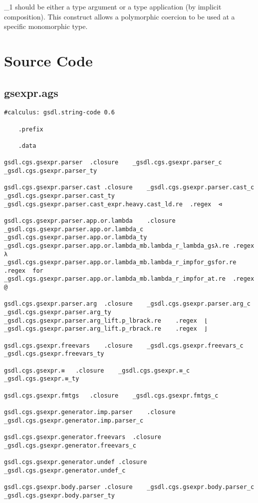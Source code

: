 \documentclass{report}
\begin{document}
\<\tau_1\> should be either a type argument or a type application (by implicit composition).
This construct allows a polymorphic coercion to be used at a specific monomorphic type.

\chapter{Source Code}

\section{gsexpr.ags}

\begin{verbatim}
#calculus: gsdl.string-code 0.6

	.prefix

	.data

gsdl.cgs.gsexpr.parser	.closure	_gsdl.cgs.gsexpr.parser_c	_gsdl.cgs.gsexpr.parser_ty

gsdl.cgs.gsexpr.parser.cast	.closure	_gsdl.cgs.gsexpr.parser.cast_c	_gsdl.cgs.gsexpr.parser.cast_ty
_gsdl.cgs.gsexpr.parser.cast_expr.heavy.cast_ld.re	.regex	⊲

gsdl.cgs.gsexpr.parser.app.or.lambda	.closure	_gsdl.cgs.gsexpr.parser.app.or.lambda_c	_gsdl.cgs.gsexpr.parser.app.or.lambda_ty
_gsdl.cgs.gsexpr.parser.app.or.lambda_mb.lambda_r_lambda_gsλ.re	.regex	λ
_gsdl.cgs.gsexpr.parser.app.or.lambda_mb.lambda_r_impfor_gsfor.re	.regex	for
_gsdl.cgs.gsexpr.parser.app.or.lambda_mb.lambda_r_impfor_at.re	.regex	@

gsdl.cgs.gsexpr.parser.arg	.closure	_gsdl.cgs.gsexpr.parser.arg_c	_gsdl.cgs.gsexpr.parser.arg_ty
_gsdl.cgs.gsexpr.parser.arg_lift.p_lbrack.re	.regex	⌊
_gsdl.cgs.gsexpr.parser.arg_lift.p_rbrack.re	.regex	⌋

gsdl.cgs.gsexpr.freevars	.closure	_gsdl.cgs.gsexpr.freevars_c	_gsdl.cgs.gsexpr.freevars_ty

gsdl.cgs.gsexpr.≡	.closure	_gsdl.cgs.gsexpr.≡_c	_gsdl.cgs.gsexpr.≡_ty

gsdl.cgs.gsexpr.fmtgs	.closure	_gsdl.cgs.gsexpr.fmtgs_c

gsdl.cgs.gsexpr.generator.imp.parser	.closure	_gsdl.cgs.gsexpr.generator.imp.parser_c

gsdl.cgs.gsexpr.generator.freevars	.closure	_gsdl.cgs.gsexpr.generator.freevars_c

gsdl.cgs.gsexpr.generator.undef	.closure	_gsdl.cgs.gsexpr.generator.undef_c

gsdl.cgs.gsexpr.body.parser	.closure	_gsdl.cgs.gsexpr.body.parser_c	_gsdl.cgs.gsexpr.body.parser_ty


\end{verbatim}
\end{document}
